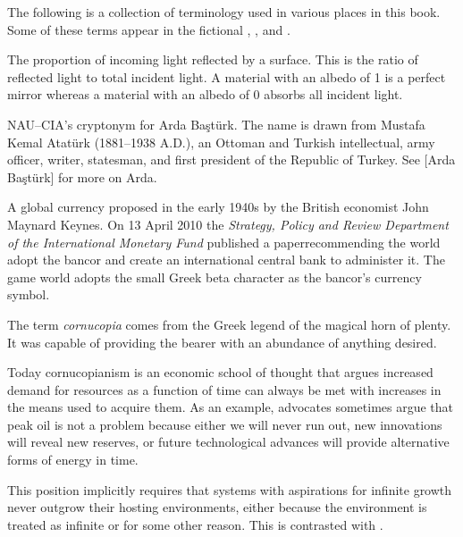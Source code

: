 

The following is a collection of terminology used in various places in this book. Some of these terms appear in the fictional , \about[Timeline], and .

The proportion of incoming light reflected by a surface. This is the ratio of reflected light to total incident light. A material with an albedo of 1 is a perfect mirror whereas a material with an albedo of 0 absorbs all incident light.

NAU--CIA's cryptonym for Arda Baştürk. The name is drawn from Mustafa Kemal Atatürk (1881--1938 A.D.), an Ottoman and Turkish intellectual, army officer, writer, statesman, and first president of the Republic of Turkey. See [Arda Baştürk] for more on Arda.

A global currency proposed in the early 1940s by the British economist John Maynard Keynes. On 13 April 2010 the {\it Strategy, Policy and Review Department of the International Monetary Fund} published a paper recommending the world adopt the bancor and create an international central bank to administer it. The game world adopts the small Greek beta character \quote{\Bancor} as the bancor's currency symbol.

The term {\it cornucopia} comes from the Greek legend of the magical horn of plenty. It was capable of providing the bearer with an abundance of anything desired.

Today cornucopianism is an economic school of thought that argues increased demand for resources as a function of time can always be met with increases in the means used to acquire them. As an example, advocates sometimes argue that peak oil is not a problem because either we will never run out, new innovations will reveal new reserves, or future technological advances will provide alternative forms of energy in time.

This position implicitly requires that systems with aspirations for infinite growth never outgrow their hosting environments, either because the environment is treated as infinite or for some other reason. This is contrasted with \about[Malthusianism].

